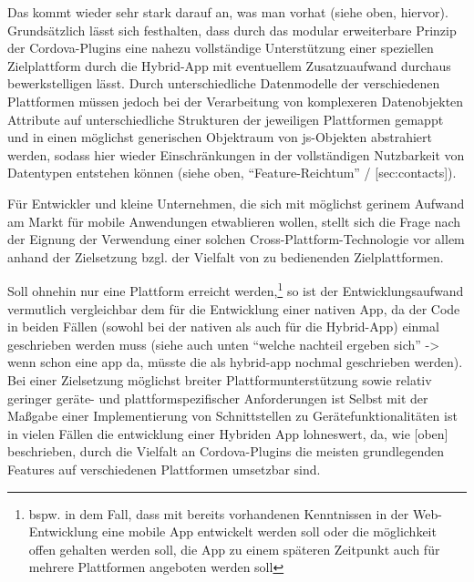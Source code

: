 
Das kommt wieder sehr stark darauf an, was man vorhat (siehe oben, hiervor).
Grundsätzlich lässt sich festhalten, dass durch das modular erweiterbare Prinzip der Cordova-Plugins eine nahezu vollständige Unterstützung einer speziellen Zielplattform durch die Hybrid-App mit eventuellem Zusatzuaufwand durchaus bewerkstelligen lässt. 
Durch unterschiedliche Datenmodelle der verschiedenen Plattformen müssen jedoch bei der Verarbeitung von komplexeren Datenobjekten Attribute auf unterschiedliche Strukturen der jeweiligen Plattformen gemappt und in einen möglichst generischen Objektraum von \gls{js}-Objekten abstrahiert werden, sodass hier wieder Einschränkungen in der vollständigen Nutzbarkeit von Datentypen entstehen können (siehe oben, “Feature-Reichtum” / [sec:contacts]).


Für Entwickler und kleine Unternehmen, die sich mit möglichst gerinem Aufwand am Markt für mobile Anwendungen etwablieren wollen, stellt sich die Frage nach der Eignung der Verwendung einer solchen Cross-Plattform-Technologie vor allem anhand der Zielsetzung bzgl. der Vielfalt von zu bedienenden Zielplattformen.

Soll ohnehin nur eine Plattform erreicht werden,\footnote{bspw. in dem Fall, dass mit bereits vorhandenen Kenntnissen in der Web-Entwicklung eine mobile App entwickelt werden soll oder die möglichkeit offen gehalten werden soll, die App zu einem späteren Zeitpunkt auch für mehrere Plattformen angeboten werden soll} so ist der Entwicklungsaufwand vermutlich vergleichbar dem für die Entwicklung einer nativen App, da der Code in beiden Fällen (sowohl bei der nativen als auch für die Hybrid-App) einmal geschrieben werden muss (siehe auch unten “welche nachteil ergeben sich” -> wenn schon eine app da, müsste die als hybrid-app nochmal geschrieben werden).
Bei einer Zielsetzung möglichst breiter Plattformunterstützung sowie relativ geringer geräte- und plattformspezifischer Anforderungen ist 
Selbst mit der Maßgabe einer Implementierung von Schnittstellen zu Gerätefunktionalitäten ist in vielen Fällen die entwicklung einer Hybriden App lohneswert, da, wie [oben] beschrieben, durch die Vielfalt an Cordova-Plugins die meisten grundlegenden Features auf verschiedenen Plattformen umsetzbar sind. 


